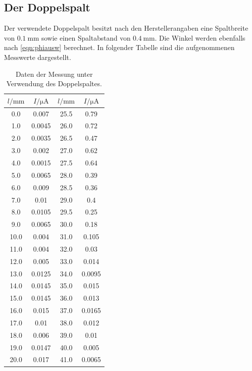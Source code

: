 \subsection{Der Doppelspalt}
Der verwendete Doppelspalt besitzt nach den Herstellerangaben eine Spaltbreite von
$\SI{0.1}{\milli\meter}$ sowie einen Spaltabstand von $\SI{0.4}{\milli\meter}$.
Die Winkel werden ebenfalls nach \eqref{eqn:phiausw} berechnet.
In folgender Tabelle sind die aufgenommenen Messwerte dargestellt.
\begin{table}[H]
  \centering
    \caption{Daten der Messung unter Verwendung des Doppelspaltes.}
    \label{tab:doppelspalt1}
    \begin{tabular}
      {S S[table-format=1.5] S S[table-format=1.5]}
      \toprule
      {$l / \si{\milli\meter}$} & {$I / \si{\micro\ampere}$} & {$l / \si{\milli\meter}$} & {$I / \si{\micro\ampere}$} \\
        & 0.007    & 25.5 & 0.79  \\
      1.0  & 0.0045   & 26.0 & 0.72  \\
      2.0  & 0.0035   & 26.5 & 0.47  \\
      3.0  & 0.002    & 27.0 & 0.62  \\
      4.0  & 0.0015   & 27.5 & 0.64  \\
      5.0  & 0.0065   & 28.0 & 0.39  \\
      6.0  & 0.009    & 28.5 & 0.36  \\
      7.0  & 0.01     & 29.0 & 0.4  \\
      8.0  & 0.0105   & 29.5 & 0.25  \\
      9.0  & 0.0065   & 30.0 & 0.18  \\
      10.0 & 0.004    & 31.0 & 0.105  \\
      11.0 & 0.004    & 32.0 & 0.03  \\
      12.0 & 0.005    & 33.0 & 0.014  \\
      13.0 & 0.0125   & 34.0 & 0.0095  \\
      14.0 & 0.0145   & 35.0 & 0.015  \\
      15.0 & 0.0145   & 36.0 & 0.013  \\
      16.0 & 0.015    & 37.0 & 0.0165  \\
      17.0 & 0.01     & 38.0 & 0.012  \\
      18.0 & 0.006    & 39.0 & 0.01  \\
      19.0 & 0.0147   & 40.0 & 0.005  \\
      20.0 & 0.017    & 41.0 & 0.0065  \\

\end{tabular}
\end{table}
